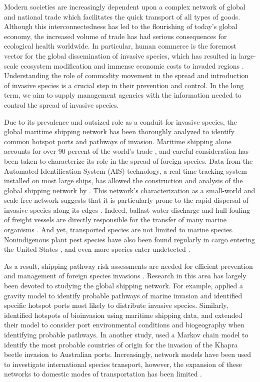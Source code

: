 \documentclass[12pt]{article}
\begin{document}
Modern societies are increasingly dependent upon a complex network of global and national trade which facilitates the quick transport of all types of goods.  Although this interconnectedness has led to the flourishing of today's global economy, the increased volume of trade has had serious consequences for ecological health worldwide.  In particular, human commerce is the foremost vector for the global dissemination of invasive species, which has resulted in large-scale ecosystem modification and immense economic costs to invaded regions \citep{Mack2000}.  Understanding the role of commodity movement in the spread and introduction of invasive species is a crucial step in their prevention and control.  In the long term, we aim to supply management agencies with the information needed to control the spread of invasive species.

Due to its prevalence and outsized role as a conduit for invasive species, the global maritime shipping network has been thoroughly analyzed to identify common hotspot ports and pathways of invasion.  Maritime shipping alone accounts for over 90 percent of the world's trade  \citep{Kaluza2009}, and careful consideration has been taken to characterize its role in the spread of foreign species.  Data from the Automated Identification System (AIS) technology, a real-time tracking system installed on most large ships, has allowed the construction and analysis of the global shipping network by  \citep{Kaluza2009}.  This network's characterization as a small-world and scale-free network suggests that it is particularly prone to the rapid dispersal of invasive species along its edges \citep{Pastor2001}.  Indeed, ballast water discharge and hull fouling of freight vessels are directly responsible for the transfer of many marine organisms \citep{Ruiz2000}.  And yet, transported species are not limited to marine species. Nonindigenous plant pest species have also been found regularly in cargo entering the United States \citep{McCullough2006, Work2005}, and even more species enter undetected \citep{Work2005}.

As a result, shipping pathway risk assessments are needed for efficient prevention and management of foreign species invasions \citep{Hulme2009}.  Research in this area has largely been devoted to studying the global shipping network.  For example, \citet{Drake2004} applied a gravity model to identify probable pathways of marine invasion and identified specific hotspot ports most likely to distribute invasive species.   Similarly, \citet{Seebens2013} identified hotspots of bioinvasion using maritime shipping data, and extended their model to consider port environmental conditions and biogeography when identifying probable pathways.  In another study, \citet{Paini2012} used a Markov chain model to identify the most probable countries of origin for the invasion of the Khapra beetle invasion to Australian ports.  Increasingly, network models have been used to investigate international species transport, however, the expansion of these networks to domestic modes of transportation has been limited \citep{Hulme2009}.
\end{document}
